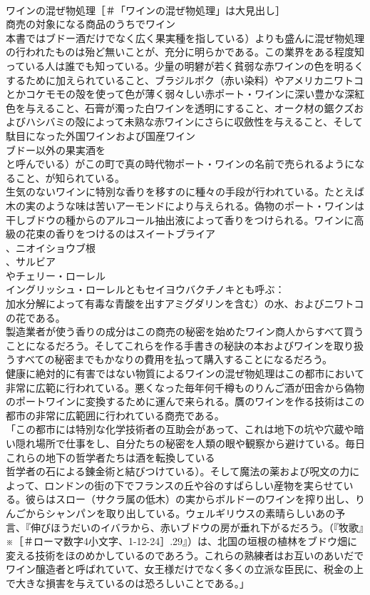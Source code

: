 \documentclass[8pt]{extreport}
\begin{document}
\begin{CJK}{UTF8}{min}
\\	ワインの混ぜ物処理［＃「ワインの混ぜ物処理」は大見出し］
\\	商売の対象になる商品のうちでワイン
\\	本書ではブドー酒だけでなく広く果実種を指している）よりも盛んに混ぜ物処理の行われたものは殆ど無いことが、充分に明らかである。この業界をある程度知っている人は誰でも知っている。少量の明礬が若く貧弱な赤ワインの色を明るくするために加えられていること、ブラジルボク（赤い染料）やアメリカニワトコとかコケモモの殻を使って色が薄く弱々しい赤ポート・ワインに深い豊かな深紅色を与えること、石膏が濁った白ワインを透明にすること、オーク材の鋸クズおよびハシバミの殻によって未熟な赤ワインにさらに収斂性を与えること、そして駄目になった外国ワインおよび国産ワイン
\\	ブドー以外の果実酒を 
\\	と呼んでいる）がこの町で真の時代物ポート・ワインの名前で売られるようになること、が知られている。
\\	生気のないワインに特別な香りを移すのに種々の手段が行われている。たとえば木の実のような味は苦いアーモンドにより与えられる。偽物のポート・ワインは干しブドウの種からのアルコール抽出液によって香りをつけられる。ワインに高級の花束の香りをつけるのはスイートブライア
\\	、ニオイショウブ根
\\	、サルビア
\\	やチェリー・ローレル
\\	イングリッシュ・ローレルともセイヨウバクチノキとも呼ぶ：
\\	加水分解によって有毒な青酸を出すアミグダリンを含む）の水、およびニワトコ
\\	の花である。
\\	製造業者が使う香りの成分はこの商売の秘密を始めたワイン商人からすべて買うことになるだろう。そしてこれらを作る手書きの秘訣の本およびワインを取り扱うすべての秘密までもかなりの費用を払って購入することになるだろう。
\\	健康に絶対的に有害ではない物質によるワインの混ぜ物処理はこの都市において非常に広範に行われている。悪くなった毎年何千樽ものりんご酒が田舎から偽物のポートワインに変換するために運んで来られる。贋のワインを作る技術はこの都市の非常に広範囲に行われている商売である。
\\	「この都市には特別な化学技術者の互助会があって、これは地下の坑や穴蔵や暗い隠れ場所で仕事をし、自分たちの秘密を人類の眼や観察から避けている。毎日これらの地下の哲学者たちは酒を転換している
\\	哲学者の石による錬金術と結びつけている）。そして魔法の薬および呪文の力によって、ロンドンの街の下でフランスの丘や谷のすばらしい産物を実らせている。彼らはスロー（サクラ属の低木）の実からボルドーのワインを搾り出し、りんごからシャンパンを取り出している。ウェルギリウスの素晴らしいあの予言、『伸びほうだいのイバラから、赤いブドウの房が垂れ下がるだろう。（『牧歌』※［＃ローマ数字4小文字、1-12-24］.29』）は、北国の垣根の植林をブドウ畑に変える技術をほのめかしているのであろう。これらの熟練者はお互いのあいだでワイン醸造者と呼ばれていて、女王様だけでなく多くの立派な臣民に、税金の上で大きな損害を与えているのは恐ろしいことである。」

\end{CJK}
\end{document}
